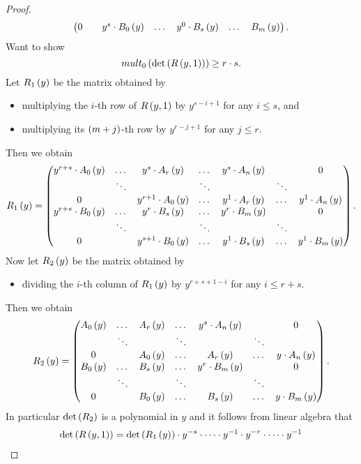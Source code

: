 \begin{proof}
$$\begin{pmatrix}
0 & & y^s \cdot B_0\left( y \right) & \dots & y^0 \cdot B_s\left( y \right) & \dots & B_m\left( y \right)
\end{pmatrix}.
$$
Want to show
$$ mult_0\left( \det\left( R\left( y, 1 \right) \right) \right) \ge r \cdot s. $$
Let $ R_1\left( y \right) $ be the matrix obtained by
\begin{itemize}
\item multiplying the $ i $-th row of $ R\left( y, 1 \right) $ by $ y^{s - i + 1} $ for any $ i \le s $, and
\item multiplying its $ \left( m + j \right) $-th row by $ y^{r - j + 1} $ for any $ j \le r $.
\end{itemize}
Then we obtain
$$ R_1\left( y \right) =
\begin{pmatrix}
y^{r + s} \cdot A_0\left( y \right) & \dots & y^s \cdot A_r\left( y \right) & \dots & y^s \cdot A_n\left( y \right) & & 0 \\
& \ddots & & \ddots & & \ddots & \\
0 & & y^{r + 1} \cdot A_0\left( y \right) & \dots & y^1 \cdot A_r\left( y \right) & \dots & y^1 \cdot A_n\left( y \right) \\
y^{r + s} \cdot B_0\left( y \right) & \dots & y^r \cdot B_s\left( y \right) & \dots & y^r \cdot B_m\left( y \right) & & 0 \\
& \ddots & & \ddots & & \ddots & \\
0 & & y^{s + 1} \cdot B_0\left( y \right) & \dots & y^1 \cdot B_s\left( y \right) & \dots & y^1 \cdot B_m\left( y \right)
\end{pmatrix}.
$$
Now let $ R_2\left( y \right) $ be the matrix obtained by
\begin{itemize}
\item dividing the $ i $-th column of $ R_1\left( y \right) $ by $ y^{r + s + 1 - i} $ for any $ i \le r + s $.
\end{itemize}
Then we obtain
$$ R_2\left( y \right) =
\begin{pmatrix}
A_0\left( y \right) & \dots & A_r\left( y \right) & \dots & y^s \cdot A_n\left( y \right) & & 0 \\
& \ddots & & \ddots & & \ddots & \\
0 & & A_0\left( y \right) & \dots & A_r\left( y \right) & \dots & y \cdot A_n\left( y \right) \\
B_0\left( y \right) & \dots & B_s\left( y \right) & \dots & y^r \cdot B_m\left( y \right) & & 0 \\
& \ddots & & \ddots & & \ddots & \\
0 & & B_0\left( y \right) & \dots & B_s\left( y \right) & \dots & y \cdot B_m\left( y \right)
\end{pmatrix}.
$$
In particular $ \det\left( R_2 \right) $ is a polynomial in $ y $ and it follows from linear algebra that
\begin{align*}
\det\rb{R\rb{y, 1}}
& = \det\rb{R_1\rb{y}} \cdot y^{-s} \cdot \dots \cdot y^{-1} \cdot y^{-r} \cdot \dots \cdot y^{-1} \\

\end{align*}
\end{proof}
